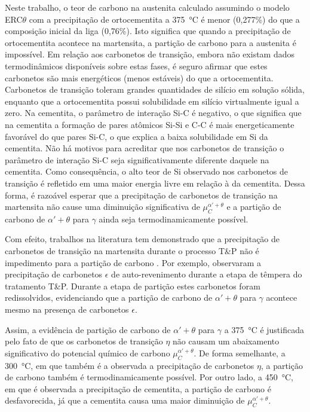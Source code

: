 Neste trabalho, o teor de carbono na austenita calculado assumindo o modelo ERC$\theta$ com a precipitação de ortocementita a \SI{375}{\degreeCelsius} é menor (0,277\%) do que a composição inicial da liga (0,76\%). Isto significa que quando a precipitação de ortocementita acontece na martensita, a partição de carbono para a austenita é impossível. Em relação aos carbonetos de transição, embora não existam dados termodinâmicos disponíveis sobre estas fases, é seguro afirmar que estes carbonetos são mais energéticos (menos estáveis) do que a ortocementita. Carbonetos de transição toleram grandes quantidades de silício em solução sólida, enquanto que a ortocementita possui solubilidade em silício virtualmente igual a zero. Na cementita, o parâmetro de interação Si-C é negativo, o que significa que na cementita a formação de pares atômicos Si-Si e C-C é mais energeticamente favorável do que pares Si-C, o que explica a baixa solubilidade em Si da cementita. Não há motivos para acreditar que nos carbonetos de transição o parâmetro de interação Si-C seja significativamente diferente daquele na cementita. Como consequência, o alto teor de Si observado nos carbonetos de transição é refletido em uma maior energia livre em relação à da cementita. Dessa forma, é razoável esperar que a precipitação de carbonetos de transição na martensita não cause uma diminuição significativa de $\mu_C^{\alpha' + \theta}$ e a partição de carbono de $\alpha' + \theta$ para $\gamma$ ainda seja termodinamicamente possível. 

Com efeito, trabalhos na literatura tem demonstrado que a precipitação de carbonetos de transição na martensita durante o processo T\&P não é impedimento para a partição de carbono \cite{Seo2016,Hajyakbary2016}. Por exemplo,  observaram a precipitação de carbonetos $\epsilon$ de auto-revenimento durante a etapa de têmpera do tratamento T\&P. Durante a etapa de partição estes carbonetos foram redissolvidos, evidenciando que a partição de carbono de $\alpha' + \theta$ para $\gamma$ acontece mesmo na presença de carbonetos $\epsilon$.

Assim, a evidência de partição de carbono de $\alpha' + \theta$ para $\gamma$ a \SI{375}{\degreeCelsius} é justificada pelo fato de que os carbonetos de transição $\eta$ não causam um abaixamento significativo do potencial químico de carbono $\mu_C^{\alpha' + \theta}$. De forma semelhante, a \SI{300}{\degreeCelsius}, em que também é a observada a precipitação de carbonetos $\eta$, a partição de carbono também é termodinamicamente possível. Por outro lado, a \SI{450}{\degreeCelsius}, em que é observada a precipitação de cementita, a partição de carbono é desfavorecida, já que a cementita causa uma maior diminuição de $\mu_C^{\alpha' + \theta}$.



